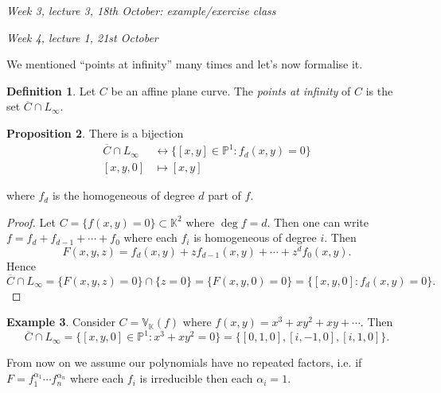 \documentclass{article}
\newcommand{\K}{\mathbb{K}}
\newcommand{\V}{\mathbb{V}}
\newcommand{\p}{\mathbb{P}}
\theoremstyle{definition}
\newtheorem{defn}{Definition}[subsection]
\newtheorem{prop}[defn]{Proposition}
\newtheorem{example}[defn]{Example}
\begin{document}
\begin{flushright}
\textit{Week 3, lecture 3, 18th October: example/exercise class}
\end{flushright}

\begin{flushright}
\textit{Week 4, lecture 1, 21st October}
\end{flushright}

We mentioned ``points at infinity'' many times and let's now formalise it.
\begin{defn}
Let $C$ be an affine plane curve. The \textit{points at infinity} of $C$ is the set $\overline C\cap L_\infty$.
\end{defn}

\begin{prop}
There is a bijection
\[
\begin{aligned}
\overline C\cap L_\infty &\leftrightarrow \{[x,y]\in\p^1:f_d(x,y)=0\} \\
[x,y,0]&\mapsto [x,y]
\end{aligned}
\]
\end{prop}
where $f_d$ is the homogeneous of degree $d$ part of $f$.
\begin{proof}
Let $C=\{f(x,y)=0\}\subset\K^2$ where $\deg f=d$. Then one can write $f=f_d+f_{d-1}+\cdots+f_0$ where each $f_i$ is homogeneous of degree $i$. Then
\[
F(x,y,z)=f_d(x,y)+zf_{d-1}(x,y)+\cdots+z^df_0(x,y).
\]
Hence
\[
\overline C\cap L_\infty=\{F(x,y,z)=0\}\cap\{z=0\}=\{F(x,y,0)=0\}=\{[x,y,0]:f_d(x,y)=0\}.
\]
\end{proof}
\begin{example}
Consider $C=\V_\K(f)$ where $f(x,y)=x^3+xy^2+xy+\cdots$. Then
\[
\overline C\cap L_\infty=\{[x,y,0]\in\p^1:x^3+xy^2=0\}=\{[0,1,0],[i,-1,0],[i,1,0]\}.
\]
\end{example}

From now on we assume our polynomials have no repeated factors, i.e. if $F=f_1^{\alpha_1}\cdots f_n^{\alpha_n}$ where each $f_i$ is irreducible then each $\alpha_i=1$.
\end{document}
